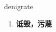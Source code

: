 
\begin{frame}
{\huge denigrate}
\begin{center}
\begin{enumerate}\Large
  \item \textbf{诋毁，污蔑}
\end{enumerate}
\end{center}
\end{frame}
